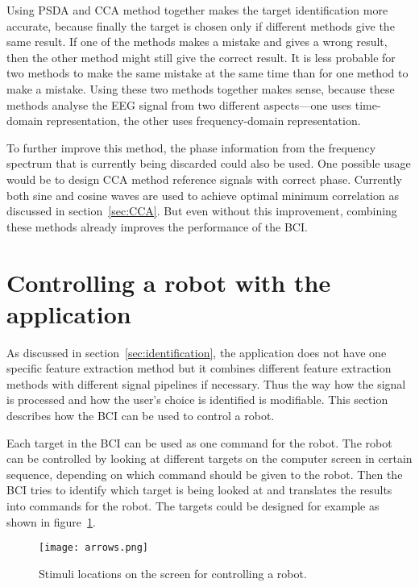 Using \gls{PSDA} and \gls{CCA} method together makes the \gls{target} identification more accurate, because finally the \gls{target} is chosen only if different methods give the same result. If one of the methods makes a mistake and gives a wrong result, then the other method might still give the correct result. It is less probable for two methods to make the same mistake at the same time than for one method to make a mistake. Using these two methods together makes sense, because these methods analyse the \gls{EEG} signal from two different aspects---one uses time-domain representation, the other uses frequency-domain representation.

To further improve this method, the phase information from the \gls{frequency spectrum} that is currently being discarded could also be used. One possible usage would be to design \gls{CCA} method \glspl{reference signal} with correct phase. Currently both sine and cosine waves are used to achieve optimal minimum correlation as discussed in section~\ref{sec:CCA}. But even without this improvement, combining these methods already improves the performance of the \gls{BCI}.

\section{Controlling a robot with the application}

As discussed in section~\ref{sec:identification}, the application does not have one specific \gls{feature extraction} method but it combines different \gls{feature extraction} methods with different signal pipelines if necessary. Thus the way how the signal is processed and how the user's choice is identified is modifiable. This section describes how the \gls{BCI} can be used to control a robot.

Each \gls{target} in the \gls{BCI} can be used as one command for the robot. The robot can be controlled by looking at different \glspl{target} on the computer screen in certain sequence, depending on which command should be given to the robot. Then the \gls{BCI} tries to identify which \gls{target} is being looked at and translates the results into commands for the robot. The \glspl{target} could be designed for example as shown in figure~\ref{fig:arrow_stimuli}.

\begin{figure}[h]
	\centering
	\texttt{[image: arrows.png]}
	\caption{Stimuli locations on the screen for controlling a robot.}
	\label{fig:arrow_stimuli}
\end{figure}

